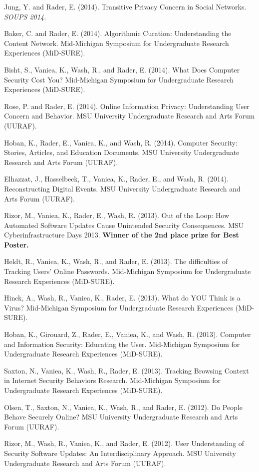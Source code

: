 \documentclass[9pt]{extarticle}
\begin{document}
Jung, Y. and Rader, E. (2014). Transitive Privacy Concern in Social Networks. \emph{SOUPS 2014.}

Baker, C. and Rader, E. (2014). Algorithmic Curation: Understanding the Content Network. Mid-Michigan Symposium for Undergraduate Research Experiences (MiD-SURE).

Bisht, S., Vaniea, K., Wash, R., and Rader, E. (2014). What Does Computer Security Cost You? Mid-Michigan Symposium for Undergraduate Research Experiences (MiD-SURE).

Rose, P. and Rader, E. (2014). Online Information Privacy: Understanding User Concern and Behavior. MSU University Undergraduate Research and Arts Forum (UURAF).

Hoban, K., Rader, E., Vaniea, K., and Wash, R. (2014). Computer Security: Stories, Articles, and Education Documents. MSU University Undergraduate Research and Arts Forum (UURAF).

Elhazzat, J., Hasselbeck, T., Vaniea, K., Rader, E., and Wash, R. (2014). Reconstructing Digital Events. MSU University Undergraduate Research and Arts Forum (UURAF).

Rizor, M., Vaniea, K., Rader, E., Wash, R. (2013). Out of the Loop: How Automated Software Updates Cause Unintended Security Consequences. MSU Cyberinfrastructure Days 2013. \textbf{Winner of the 2nd place prize for Best Poster.}

Heldt, R., Vaniea, K., Wash, R., and Rader, E. (2013). The difficulties of Tracking Users' Online Passwords. Mid-Michigan Symposium for Undergraduate Research Experiences (MiD-SURE). 

Hinck, A., Wash, R., Vaniea, K., Rader, E. (2013). What do YOU Think is a Virus? Mid-Michigan Symposium for Undergraduate Research Experiences (MiD-SURE).

Hoban, K., Girouard, Z., Rader, E., Vaniea, K., and Wash, R. (2013). Computer and Information Security: Educating the User. Mid-Michigan Symposium for Undergraduate Research Experiences (MiD-SURE).

Saxton, N., Vaniea, K., Wash, R., Rader, E. (2013). Tracking Browsing Context in Internet Security Behaviors Research. Mid-Michigan Symposium for Undergraduate Research Experiences (MiD-SURE).

Olsen, T., Saxton, N., Vaniea, K., Wash, R., and Rader, E. (2012). Do People Behave Securely Online? MSU University Undergraduate Research and Arts Forum (UURAF).

Rizor, M., Wash, R., Vaniea, K., and Rader, E. (2012). User Understanding of Security Software Updates: An Interdisciplinary Approach. MSU University Undergraduate Research and Arts Forum (UURAF).
\end{document}
